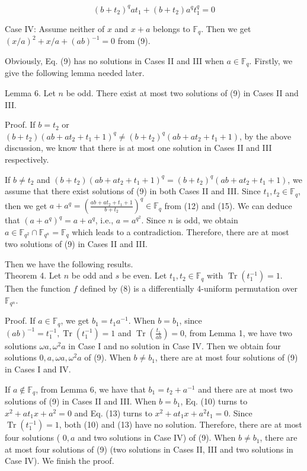 \documentclass[10pt]{article}
\begin{document}
\begin{equation*}
\left(b+t_{2}\right)^{q} a t_{1}+\left(b+t_{2}\right) a^{q} t_{1}^{q}=0 \tag{15}
\end{equation*}


Case IV: Assume neither of $x$ and $x+a$ belongs to $\mathbb{F}_{q}$. Then we get $(x / a)^{2}+x / a+(a b)^{-1}=0$ from (9).

Obviously, Eq. (9) has no solutions in Cases II and III when $a \in \mathbb{F}_{q}$. Firstly, we give the following lemma needed later.

Lemma 6. Let $n$ be odd. There exist at most two solutions of (9) in Cases II and III.

Proof. If $b=t_{2}$ or $\left(b+t_{2}\right)\left(a b+a t_{2}+t_{1}+1\right)^{q} \neq\left(b+t_{2}\right)^{q}\left(a b+a t_{2}+t_{1}+1\right)$, by the above discussion, we know that there is at most one solution in Cases II and III respectively.

If $b \neq t_{2}$ and $\left(b+t_{2}\right)\left(a b+a t_{2}+t_{1}+1\right)^{q}=\left(b+t_{2}\right)^{q}\left(a b+a t_{2}+t_{1}+1\right)$, we assume that there exist solutions of (9) in both Cases II and III. Since $t_{1}, t_{2} \in \mathbb{F}_{q}$, then we get $a+a^{q}=\left(\frac{a b+a t_{2}+t_{1}+1}{b+t_{2}}\right)^{q} \in \mathbb{F}_{q}$ from (12) and (15). We can deduce that $\left(a+a^{q}\right)^{q}=a+a^{q}$, i.e., $a=a^{q^{2}}$. Since $n$ is odd, we obtain $a \in \mathbb{F}_{q^{2}} \cap \mathbb{F}_{q^{n}}=\mathbb{F}_{q}$ which leads to a contradiction. Therefore, there are at most two solutions of (9) in Cases II and III.

Then we have the following results.\\
Theorem 4. Let $n$ be odd and $s$ be even. Let $t_{1}, t_{2} \in \mathbb{F}_{q}$ with $\operatorname{Tr}\left(t_{1}^{-1}\right)=1$. Then the function $f$ defined by (8) is a differentially 4-uniform permutation over $\mathbb{F}_{q^{n}}$.

Proof. If $a \in \mathbb{F}_{q}$, we get $b_{1}=t_{1} a^{-1}$. When $b=b_{1}$, since $(a b)^{-1}=t_{1}^{-1}, \operatorname{Tr}\left(t_{1}^{-1}\right)=1$ and $\operatorname{Tr}\left(\frac{t_{1}}{a b}\right)=0$, from Lemma 1, we have two solutions $\omega a, \omega^{2} a$ in Case I and no solution in Case IV. Then we obtain four solutions $0, a, \omega a, \omega^{2} a$ of (9). When $b \neq b_{1}$, there are at most four solutions of (9) in Cases I and IV.

If $a \notin \mathbb{F}_{q}$, from Lemma 6, we have that $b_{1}=t_{2}+a^{-1}$ and there are at most two solutions of (9) in Cases II and III. When $b=b_{1}$, Eq. (10) turns to $x^{2}+a t_{1} x+a^{2}=0$ and Eq. (13) turns to $x^{2}+a t_{1} x+ a^{2} t_{1}=0$. Since $\operatorname{Tr}\left(t_{1}^{-1}\right)=1$, both (10) and (13) have no solution. Therefore, there are at most four solutions ( $0, a$ and two solutions in Case IV) of (9). When $b \neq b_{1}$, there are at most four solutions of (9) (two solutions in Cases II, III and two solutions in Case IV). We finish the proof.
\end{document}
